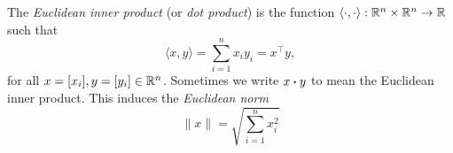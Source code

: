 The \textit{Euclidean inner product} (or \textit{dot product}) is the function \(\langle \cdot, \cdot \rangle : \mathbb{R}^n \times \mathbb{R}^n \to \mathbb{R}\) such that
\begin{equation}
    \langle x, y \rangle = \sum_{i=1}^{n} x_i y_i = x^\top y,
\end{equation}
for all \(x = [x_i], y = [y_i] \in \mathbb{R}^n\).
Sometimes we write \(x \boldsymbol{\cdot} y\) to mean the Euclidean inner product.
This induces the \textit{Euclidean norm}
\begin{equation}
    \|x\| = \sqrt{\sum_{i=1}^{n} x_i^2}
\end{equation}

